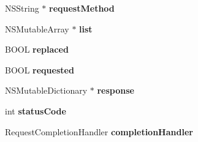 \begin{DoxyCompactItemize}
\item 
\hypertarget{interface_model_base_a3abc953e1fcc0ada1277ccd3697459d3}{}N\+S\+String $\ast$ {\bfseries request\+Method}\label{interface_model_base_a3abc953e1fcc0ada1277ccd3697459d3}

\item 
\hypertarget{interface_model_base_aeb9dfecd494145588a1f3b2dd8053570}{}N\+S\+Mutable\+Array $\ast$ {\bfseries list}\label{interface_model_base_aeb9dfecd494145588a1f3b2dd8053570}

\item 
\hypertarget{interface_model_base_afb02e7ca4f8c608c69fb70c7f226c7f2}{}B\+O\+O\+L {\bfseries replaced}\label{interface_model_base_afb02e7ca4f8c608c69fb70c7f226c7f2}

\item 
\hypertarget{interface_model_base_a33c104ee13e425e02dfb3f669f0177ed}{}B\+O\+O\+L {\bfseries requested}\label{interface_model_base_a33c104ee13e425e02dfb3f669f0177ed}

\item 
\hypertarget{interface_model_base_a462a22a2568cbeb8f0a7a50269233d44}{}N\+S\+Mutable\+Dictionary $\ast$ {\bfseries response}\label{interface_model_base_a462a22a2568cbeb8f0a7a50269233d44}

\item 
\hypertarget{interface_model_base_a8e63ffe7dcffd1c76cca57c32c77a152}{}int {\bfseries status\+Code}\label{interface_model_base_a8e63ffe7dcffd1c76cca57c32c77a152}

\item 
\hypertarget{interface_model_base_a11d0650c8de121c4f93fb353007362fd}{}Request\+Completion\+Handler {\bfseries completion\+Handler}\label{interface_model_base_a11d0650c8de121c4f93fb353007362fd}

\end{DoxyCompactItemize}
